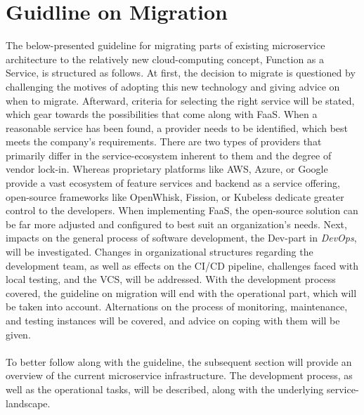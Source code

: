\documentclass[11pt]{article}
\begin{document}
\section{Guidline on Migration}
The below-presented guideline for migrating parts of existing microservice architecture to the relatively new cloud-computing concept, Function as a Service, is structured as follows. At first, the decision to migrate is questioned by challenging the motives of adopting this new technology and giving advice on when to migrate. Afterward, criteria for selecting the right service will be stated, which gear towards the possibilities that come along with FaaS. When a reasonable service has been found, a provider needs to be identified, which best meets the company's requirements. There are two types of providers that primarily differ in the service-ecosystem inherent to them and the degree of vendor lock-in. Whereas proprietary platforms like AWS, Azure, or Google provide a vast ecosystem of feature services and backend as a service offering, open-source frameworks like OpenWhisk, Fission, or Kubeless dedicate greater control to the developers. When implementing FaaS, the open-source solution can be far more adjusted and configured to best suit an organization's needs. Next, impacts on the general process of software development, the \glqq Dev\grqq{}-part in \textit{DevOps}, will be investigated. Changes in organizational structures regarding the development team, as well as effects on the CI/CD pipeline, challenges faced with local testing, and the VCS, will be addressed. With the development process covered, the guideline on migration will end with the operational part, which will be taken into account. Alternations on the process of monitoring, maintenance, and testing instances will be covered, and advice on coping with them will be given. \\\\
To better follow along with the guideline, the subsequent section will provide an overview of the current microservice infrastructure. The development process, as well as the operational tasks, will be described, along with the underlying service-landscape.
\end{document}
